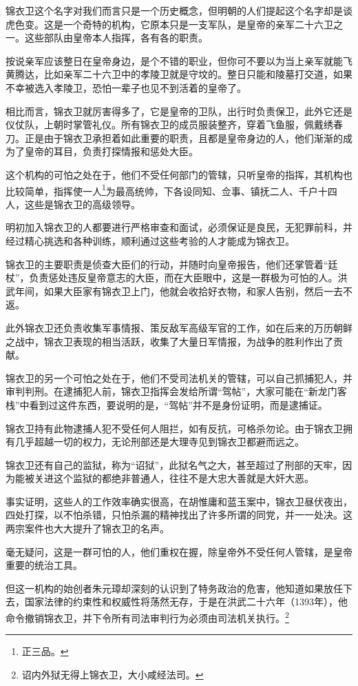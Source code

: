 \begin{multicols}{\theparacolNo}
		锦衣卫这个名字对我们而言只是一个历史概念，但明朝的人们提起这个名字却是谈虎色变。这是一个奇特的机构，它原本只是一支军队，是皇帝的亲军二十六卫之一。这些部队由皇帝本人指挥，各有各的职责。

		按说亲军应该整日在皇帝身边，是个不错的职业，但你可不要以为当上亲军就能飞黄腾达，比如亲军二十六卫中的孝陵卫就是守坟的。整日只能和陵墓打交道，如果不幸被选入孝陵卫，恐怕一辈子也见不到活着的皇帝了。

		相比而言，锦衣卫就厉害得多了，它是皇帝的卫队，出行时负责保卫，此外它还是仪仗队，上朝时掌管礼仪。所有锦衣卫的成员服装整齐，穿着飞鱼服，佩戴绣春刀。正是由于锦衣卫承担着如此重要的职责，且都是皇帝身边的人，他们渐渐的成为了皇帝的耳目，负责打探情报和惩处大臣。

		这个机构的可怕之处在于，他们不受任何部门的管辖，只听皇帝的指挥，其机构也比较简单，指挥使一人\footnote{正三品。}为最高统帅，下各设同知、佥事、镇抚二人、千户十四人，这些是锦衣卫的高级领导。

		明初加入锦衣卫的人都要进行严格审查和面试，必须保证是良民，无犯罪前科，并经过精心挑选和各种训练，顺利通过这些考验的人才能成为锦衣卫。

		锦衣卫的主要职责是侦查大臣们的行动，并随时向皇帝报告，他们还掌管着“廷杖”，负责惩处违反皇帝意志的大臣，而在大臣眼中，这是一群极为可怕的人。洪武年间，如果大臣家有锦衣卫上门，他就会收拾好衣物，和家人告别，然后一去不返。

		此外锦衣卫还负责收集军事情报、策反敌军高级军官的工作，如在后来的万历朝鲜之战中，锦衣卫表现的相当活跃，收集了大量日军情报，为战争的胜利作出了贡献。

		锦衣卫的另一个可怕之处在于，他们不受司法机关的管辖，可以自己抓捕犯人，并审判判刑。在逮捕犯人前，锦衣卫指挥会发给所谓“驾帖”，大家可能在“新龙门客栈”中看到过这件东西，要说明的是，“驾帖”并不是身份证明，而是逮捕证。

		锦衣卫持有此物逮捕人犯不受任何人阻拦，如有反抗，可格杀勿论。由于锦衣卫拥有几乎超越一切的权力，无论刑部还是大理寺见到锦衣卫都避而远之。

		锦衣卫还有自己的监狱，称为“诏狱”，此狱名气之大，甚至超过了刑部的天牢，因为能被关进这个监狱的都绝非普通人，往往不是大忠大善就是大奸大恶。

		事实证明，这些人的工作效率确实很高，在胡惟庸和蓝玉案中，锦衣卫昼伏夜出，四处打探，以不怕杀错，只怕杀漏的精神找出了许多所谓的同党，并一一处决。这两宗案件也大大提升了锦衣卫的名声。

		毫无疑问，这是一群可怕的人，他们重权在握，除皇帝外不受任何人管辖，是皇帝重要的统治工具。

		但这一机构的始创者朱元璋却深刻的认识到了特务政治的危害，他知道如果放任下去，国家法律的约束性和权威性将荡然无存，于是在洪武二十六年（1393年），他命令撤销锦衣卫，并下令所有司法审判行为必须由司法机关执行。\footnote{诏内外狱无得上锦衣卫，大小咸经法司。}


\end{multicols}
